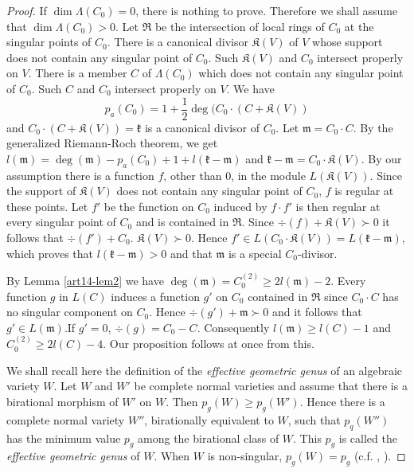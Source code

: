 \begin{proof}
If $\dim \Lambda(C_{0})=0$, there is nothing to prove. Therefore we shall assume that $\dim \Lambda (C_{0})>0$. Let $\mathfrak{R}$ be the intersection of local rings of $C_{0}$ at the singular points of $C_{0}$. There is a canonical divisor $\mathfrak{K}(V)$ of $V$ whose support does not contain any singular point of $C_{0}$. Such $\mathfrak{K}(V)$ and $C_{0}$ intersect properly on $V$. There is a member $C$ of $\Lambda (C_{0})$ which does not contain any singular point of $C_{0}$. Such $C$ and $C_{0}$ intersect properly on $V$. We have 
$$
p_{a}(C_{0})=1+\frac{1}{2}\deg (C_{0}\cdot (C+\mathfrak{K}(V))
$$
and $C_{0}\cdot (C+\mathfrak{K}(V))=\mathfrak{k}$ is a canonical divisor of $C_{0}$. Let $\mathfrak{m}=C_{0}\cdot C$. By the generalized Riemann-Roch theorem, we get $l(\mathfrak{m})=\deg (\mathfrak{m})-p_{a}(C_{0})+1+l(\mathfrak{k}-\mathfrak{m})$ and $\mathfrak{k}-\mathfrak{m}=C_{0}\cdot \mathfrak{K}(V)$. By our assumption there is a function $f$, other than $0$, in the module $L(\mathfrak{K}(V))$. Since the support of $\mathfrak{K}(V)$ does not contain any singular point of $C_{0}$, $f$ is regular at these points. Let $f'$ be the function on $C_{0}$ induced by $f\cdot f'$ is then regular at every singular point of $C_{0}$ and is contained in $\mathfrak{R}$. Since $\div (f)+\mathfrak{K}(V)\succ 0$ it follows that $\div(f')+C_{0}$. $\mathfrak{K}(V)\succ 0$. Hence $f'\in L(C_{0}\cdot \mathfrak{K}(V))=L(\mathfrak{k}-\mathfrak{m})$, which proves that $l(\mathfrak{k}-\mathfrak{m})>0$ and that $\mathfrak{m}$ is a special $C_{0}$-divisor.

By Lemma \ref{art14-lem2} we have $\deg (\mathfrak{m})=C^{(2)}_{0}\geq 2l(\mathfrak{m})-2$. Every function $g$ in $L(C)$ induces a function $g'$ on $C_{0}$ contained in $\mathfrak{R}$ since $C_{0}\cdot C$ has no singular component on $C_{0}$. Hence $\div (g')+\mathfrak{m}\succ 0$ and it follows that $g'\in L(\mathfrak{m})$.\pageoriginale If $g'=0$, $\div(g)=C_{0}-C$. Consequently $l(\mathfrak{m})\geq l(C)-1$ and $C^{(2)}_{0}\geq 2l(C)-4$. Our proposition follows at once from this.

We shall recall here the definition of the {\em effective geometric genus} of an algebraic variety $W$. Let $W$ and $W'$ be complete normal varieties and assume that there is a birational morphism of $W'$ on $W$. Then $p_{g}(W)\geq p_{g}(W')$. Hence there is a complete normal variety $W''$, birationally equivalent to $W$, such that $p_{q}(W'')$ has the minimum value $p_{g}$ among the birational class of $W$. This $p_{g}$ is called the {\em effective geometric genus} of $W$. When $W$ is non-singular, $p_{g}(W)=p_{g}$ (c.f. \cite{art14-key13}, \cite{art14-key31}).
\end{proof}

